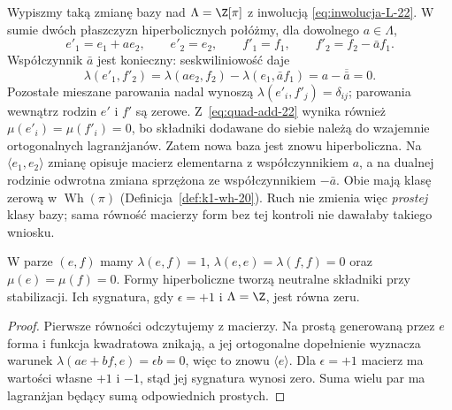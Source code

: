 Wypiszmy taką zmianę bazy nad
$\Lambda=\Z[\pi]$ z inwolucją
\eqref{eq:inwolucja-L-22}. W sumie dwóch
płaszczyzn hiperbolicznych połóżmy, dla
dowolnego $a\in\Lambda$,
\[
 e'_1=e_1+a e_2,\qquad e'_2=e_2,\qquad
 f'_1=f_1,\qquad f'_2=f_2-\bar a f_1.
\]
Współczynnik $\bar a$ jest konieczny:
seskwiliniowość daje
\[
 \lambda(e'_1,f'_2)
 =\lambda(ae_2,f_2)-\lambda(e_1,\bar a f_1)
 =a-\overline{\bar a}=0.
\]
Pozostałe mieszane parowania nadal wynoszą
$\lambda(e'_i,f'_j)=\delta_{ij}$; parowania
wewnątrz rodzin $e'$ i $f'$ są zerowe.
Z~\eqref{eq:quad-add-22} wynika również
$\mu(e'_i)=\mu(f'_i)=0$, bo składniki dodawane
do siebie należą do wzajemnie ortogonalnych
lagranżjanów. Zatem nowa baza jest znowu
hiperboliczna. Na $\langle e_1,e_2\rangle$
zmianę opisuje macierz elementarna z
współczynnikiem $a$, a na dualnej rodzinie
odwrotna zmiana sprzężona ze współczynnikiem
$-\bar a$. Obie mają klasę zerową w
$\operatorname{Wh}(\pi)$
(Definicja~\ref{def:k1-wh-20}). Ruch nie zmienia
więc \emph{prostej} klasy bazy; sama równość
macierzy form bez tej kontroli nie dawałaby
takiego wniosku.

\begin{stwierdzenie}
\label{prop:hiperboliczna-22}
W parze $(e,f)$ mamy $\lambda(e,f)=1$,
$\lambda(e,e)=\lambda(f,f)=0$ oraz
$\mu(e)=\mu(f)=0$. Formy hiperboliczne
tworzą neutralne składniki przy stabilizacji.
Ich sygnatura, gdy $\epsilon=+1$ i $\Lambda=\Z$,
jest równa zeru.
\end{stwierdzenie}
\begin{proof}
Pierwsze równości odczytujemy z macierzy.
Na prostą generowaną przez $e$ forma
i funkcja kwadratowa znikają, a jej
ortogonalne dopełnienie wyznacza warunek
$\lambda(ae+bf,e)=\epsilon b=0$, więc
to znowu $\langle e\rangle$.
Dla $\epsilon=+1$ macierz ma wartości własne
$+1$ i $-1$, stąd jej sygnatura wynosi zero.
Suma wielu par ma lagranżjan będący sumą
odpowiednich prostych.
\end{proof}

